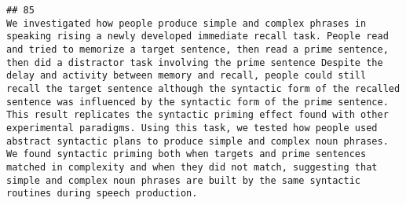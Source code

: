 \documentclass[
  english,
  man]{apa6}
\begin{document}
\begin{verbatim}
## 85                                                                                                                                                                                                                                                                                                                                                                                                                                                                                                                                                                                                                                                                                                                                                                                                                                                                                                                                                                                                                                                                                                                                                                                                                                                                                                                                                                                                                                                                                                                                                                                                                                                                                                                           We investigated how people produce simple and complex phrases in speaking rising a newly developed immediate recall task. People read and tried to memorize a target sentence, then read a prime sentence, then did a distractor task involving the prime sentence Despite the delay and activity between memory and recall, people could still recall the target sentence although the syntactic form of the recalled sentence was influenced by the syntactic form of the prime sentence. This result replicates the syntactic priming effect found with other experimental paradigms. Using this task, we tested how people used abstract syntactic plans to produce simple and complex noun phrases. We found syntactic priming both when targets and prime sentences matched in complexity and when they did not match, suggesting that simple and complex noun phrases are built by the same syntactic routines during speech production.

\end{verbatim}
\end{document}
